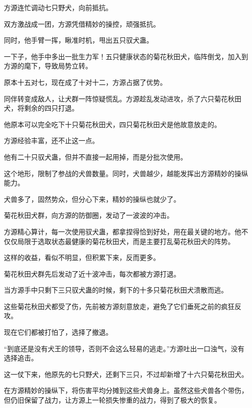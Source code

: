\begin{this_body}
方源连忙调动七只野犬，向前抵抗。

双方激战成一团，方源凭借精妙的操控，顽强抵抗。

同时，他手臂一挥，瞅准时机，甩出五只驭犬蛊。

一下子，他手中多出一批生力军！五只健康状态的菊花秋田犬，临阵倒戈，加入到方源的麾下，导致局势立转。

原本十五对七，现在成了十对十二，方源占据了优势。

同伴转变成敌人，让犬群一阵惊疑慌乱。方源趁乱发动进攻，杀了六只菊花秋田犬，将剩余的四只打退。

他原本可以完全吃下十只菊花秋田犬，四只菊花秋田犬是他故意放走的。

方源经验丰富，还不止这一点。

他有二十只驭犬蛊，但并不直接一起用掉，而是分批次使用。

这个地形，限制了参战的犬兽数量。同时，犬兽越少，越能发挥出方源精妙的操纵能力。

犬兽多了，固然势众，但分心下来，精妙的操纵也就少了。

菊花秋田犬群，向方源的防御圈，发动了一波波的冲击。

方源精心算计，每一次使用驭犬蛊，都拿捏得恰到好处，用在最关键的地方。他不仅仅局限于选取状态最健康的菊花秋田犬，而是主要打乱菊花秋田犬的阵势。

这样的收益，看似不明显，但积累下来，反而更多。

菊花秋田犬群先后发动了近十波冲击，每次都被方源打退。

当方源手中只剩下三只驭犬蛊的时候，剩下的十多只菊花秋田犬溃散而逃。

这些菊花秋田犬都受了伤，先前被方源刻意放走，避免了它们垂死之前的疯狂反攻。

现在它们都被打怕了，选择了撤退。

“到底还是没有犬王的领导，否则不会这么轻易的逃走。”方源吐出一口浊气，没有选择追击。

这一仗下来，他原先的七只野犬，还剩下三只，不过却新增了十六只菊花秋田犬。

在方源精妙的操纵下，将伤害平均分摊到这些犬兽身上。虽然这些犬兽各个带伤，但仍旧保留了战力，让方源上一轮损失惨重的战力，得到了极大的恢复。

\end{this_body}


